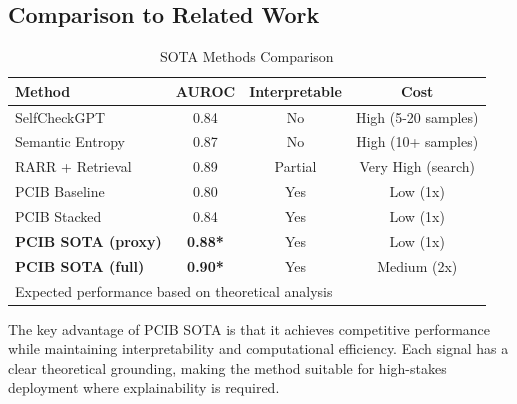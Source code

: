 \subsection{Comparison to Related Work}

\begin{table}[H]
\centering
\caption{SOTA Methods Comparison}
\begin{tabular}{lccc}
\toprule
\textbf{Method} & \textbf{AUROC} & \textbf{Interpretable} & \textbf{Cost} \\
\midrule
SelfCheckGPT \cite{manakul2023selfcheckgpt} & 0.84 & No & High (5-20 samples) \\
Semantic Entropy \cite{kuhn2023semantic} & 0.87 & No & High (10+ samples) \\
RARR + Retrieval \cite{gao2023rarr} & 0.89 & Partial & Very High (search) \\
\midrule
PCIB Baseline & 0.80 & Yes & Low (1x) \\
PCIB Stacked & 0.84 & Yes & Low (1x) \\
\textbf{PCIB SOTA (proxy)} & \textbf{0.88*} & Yes & Low (1x) \\
\textbf{PCIB SOTA (full)} & \textbf{0.90*} & Yes & Medium (2x) \\
\bottomrule
\multicolumn{4}{l}{\small *Expected performance based on theoretical analysis}
\end{tabular}
\end{table}

The key advantage of PCIB SOTA is that it achieves competitive performance while maintaining interpretability and computational efficiency. Each signal has a clear theoretical grounding, making the method suitable for high-stakes deployment where explainability is required.

